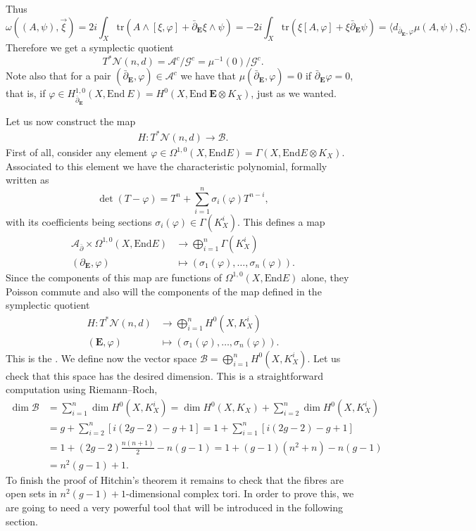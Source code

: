 \documentclass[12pt,a4paper]{book}
\theoremstyle{definition} \newtheorem{defn}[thm]{Definition}
\theoremstyle{definition} \newtheorem{ejemplo}[thm]{Example}
\theoremstyle{remark} \newtheorem{rem}[thm]{Remark}
\def\AA{\mathscr{A}}
\def\BB{\mathscr{B}}
\def\GG{\mathscr{G}}
\def\tr{\mathrm{tr}}
\def\End{\mathrm{End}}
\def\Bun{\mathscr{N}}
\def\delbar{\bar{\partial}}
\newcommand{\ve}[1]{\mathbf{#1}}
\let\emph\relax
\begin{document}
  Thus
  \begin{equation*}
    \omega\left( (A,\psi),\vec{\xi} \right)=2i\int_X \tr(A\wedge[\xi,\varphi] + \delbar_{\ve{E}} \xi \wedge \psi)=- 2i\int_X \tr(\xi[A,\varphi] + \xi \delbar_{\ve{E}} \psi)=\langle d_{\delbar_{\ve{E}},\varphi}\mu(A,\psi),\xi \rangle.
  \end{equation*}
  Therefore we get a symplectic quotient $$T^*\Bun(n,d)=\AA^{c}/\GG^c=\mu^{-1}(0)/\GG^c.$$   Note also that for a pair $(\delbar_{\ve{E}},\varphi)\in \AA^c$ we have that $\mu(\delbar_{\ve{E}},\varphi)=0$ if $\delbar_{\ve{E}} \varphi=0$, that is, if $\varphi\in H_{\delbar_{\ve{E}}}^{1,0}(X, \End\ E)=H^0(X,\End\ \ve{E} \otimes K_X)$, just as we wanted.

  Let us now construct the map 
  \begin{align*}
    H :T^*\Bun(n,d)\rightarrow \BB.
    \end{align*}
    First of all, consider any element $\varphi \in \Omega^{1,0}(X,\End E)=\Gamma(X,\End E \otimes K_X)$. Associated to this element we have the characteristic polynomial, formally written as
    \begin{equation*}
      \det(T-\varphi)=T^n + \sum_{i=1}^{n} \sigma_i(\varphi) T^{n-i},
    \end{equation*}
    with its coefficients being sections $\sigma_i(\varphi) \in \Gamma(K_X^i)$. This defines a map
    \begin{align*}
      \AA_{\delbar} \times \Omega^{1,0}(X,\End E)&\longrightarrow \bigoplus_{i=1}^n \Gamma(K_X^i)\\ 
      (\partial_{\ve{E}},\varphi) &\longmapsto (\sigma_1(\varphi),\dots,\sigma_n(\varphi)). 
      \end{align*}
      Since the components of this map are functions of $\Omega^{1,0}(X,\End E)$ alone, they Poisson commute and also will the components of the map defined in the symplectic quotient
      \begin{align*}
	H :T^*\Bun(n,d)&\longrightarrow \bigoplus_{i=1}^n H^0(X,K^i_X)\\ 
	(\ve{E},\varphi) &\longmapsto (\sigma_1(\varphi),\dots,\sigma_n(\varphi)). 
	\end{align*}
	This is the \emph{Hitchin map}. We define now the vector space $\BB= \bigoplus_{i=1}^n H^0(X,K^i_X)$. Let us check that this space has the desired dimension. This is a straightforward computation using Riemann--Roch,
	\begin{align*}
      \dim \BB &= \sum_{i=1}^n \dim H^0(X,K_X^i)= \dim H^0(X,K_X) + \sum_{i=2}^n \dim H^0(X,K_X^i)\\
      &= g + \sum_{i=2}^n [i(2g-2)-g+1] =1+ \sum_{i=1}^n [i(2g-2)-g+1] \\
      &= 1+ (2g-2)\frac{n(n+1)}{2} - n(g-1) = 1+(g-1)(n^2+n) - n(g-1) \\
      &= n^2(g-1)+1.
    \end{align*}
    To finish the proof of Hitchin's theorem it remains to check that the fibres are open sets in $n^2(g-1)+1$-dimensional complex tori. In order to prove this, we are going to need a very powerful tool that will be introduced in the following section.
\end{document}

